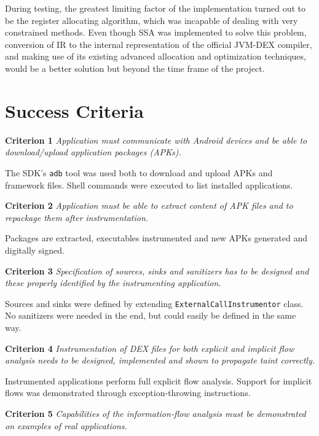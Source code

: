 \documentclass[12pt,twoside,notitlepage]{report}
\begin{document}
During testing, the greatest limiting factor of the implementation turned out to be the register allocating algorithm, which was incapable of dealing with very constrained methods. Even though SSA was implemented to solve this problem, conversion of IR to the internal representation of the official JVM-DEX compiler, and making use of its existing advanced allocation and optimization techniques, would be a better solution but beyond the time frame of the project.

\section{Success Criteria}

\begin{description}
	\item \textbf{Criterion 1} \emph{Application must communicate with Android devices and be able to download/upload application packages (APKs).}

	The SDK's \texttt{adb} tool was used both to download and upload APKs and framework files. Shell commands were executed to list installed applications.
	\item \textbf{Criterion 2} \emph{Application must be able to extract content of APK files and to repackage them after instrumentation.}

	Packages are extracted, executables instrumented and new APKs generated and digitally signed.

	\item \textbf{Criterion 3} \emph{Specification of sources, sinks and sanitizers has to be designed and these properly identified by the instrumenting application.}

	Sources and sinks were defined by extending \verb$ExternalCallInstrumentor$ class. No sanitizers were needed in the end, but could easily be defined in the same way.

	\item \textbf{Criterion 4} \emph{Instrumentation of DEX files for both explicit and implicit flow analysis needs to be designed, implemented and shown to propagate taint correctly.}

	Instrumented applications perform full explicit flow analysis. Support for implicit flows was demonstrated through exception-throwing instructions.

	\item \textbf{Criterion 5} \emph{Capabilities of the information-flow analysis must be demonstrated on examples of real applications.}


\end{description}
\end{document}
